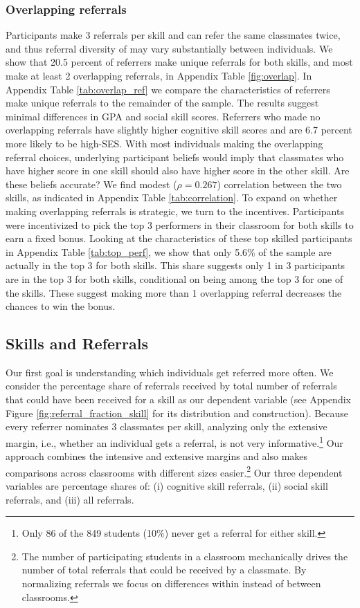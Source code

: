 \documentclass[11pt,a4paper,oneside]{article}
\begin{document}
\subsubsection*{Overlapping referrals}
Participants make 3 referrals per skill and can refer the same classmates twice, and thus referral diversity of may vary substantially between individuals. We show that 20.5 percent of referrers make unique referrals for both skills, and most make at least 2 overlapping referrals, in Appendix Table \ref{fig:overlap}. In Appendix Table \ref{tab:overlap_ref} we compare the characteristics of referrers make unique referrals to the remainder of the sample. The results suggest minimal differences in GPA and social skill scores. Referrers who made no overlapping referrals have slightly higher cognitive skill scores and are 6.7 percent more likely to be high-SES. With most individuals making the overlapping referral choices, underlying participant beliefs would imply that classmates who have higher score in one skill should also have higher score in the other skill. Are these beliefs accurate? We find  modest ($\rho = 0.267$) correlation between the two skills, as indicated in Appendix Table \ref{tab:correlation}. To expand on whether making overlapping referrals is strategic, we turn to the incentives. Participants were incentivized to pick the top 3 performers in their classroom for both skills to earn a fixed bonus. Looking at the characteristics of these top skilled participants in Appendix Table \ref{tab:top_perf}, we show that only 5.6\% of the sample are actually in the top 3 for both skills. This share suggests only 1 in 3 participants are in the top 3 for both skills, conditional on being among the top 3 for one of the skills. These suggest making more than 1 overlapping referral decreases the chances to win the bonus.
\subsection{Skills and Referrals}
Our first goal is understanding which individuals get referred more often. We consider the percentage share of referrals received by total number of referrals that could have been received for a skill as our dependent variable (see Appendix Figure \ref{fig:referral_fraction_skill} for its distribution and construction). Because every referrer nominates 3 classmates per skill, analyzing only the extensive margin, i.e., whether an individual gets a referral, is not very informative.\footnote{Only 86 of the 849 students (10\%) never get a referral for either skill.} Our approach combines the intensive and extensive margins and also makes comparisons across classrooms with different sizes easier.\footnote{The number of participating students in a classroom mechanically drives the number of total referrals that could be received by a classmate. By normalizing referrals we focus on differences within instead of between classrooms.} Our three dependent variables are percentage shares of: (i) cognitive skill referrals, (ii) social skill referrals, and (iii) all referrals.
\end{document}
